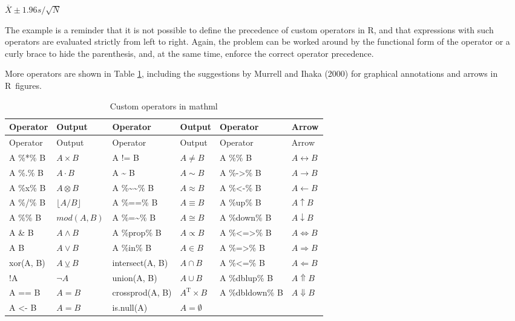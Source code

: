 \({\overline{X}}{\pm}{{{1.96}{{}}{s}}{/}{\sqrt{N}}}\)

The example is a reminder that it is not possible to define the
precedence of custom operators in R, and that expressions with such
operators are evaluated strictly from left to right. Again, the problem
can be worked around by the functional form of the operator or a curly
brace to hide the parenthesis, and, at the same time, enforce the
correct operator precedence.

More operators are shown in Table
\protect\hyperlink{tab:custom-operators}{1}, including the suggestions by Murrell
and Ihaka (2000) for graphical annotations and arrows in R~figures.

\hypertarget{tab:custom-operators}{}
\begin{longtable}[]{@{}llllll@{}}
\caption{Custom operators in mathml}\tabularnewline
\toprule\noalign{}
Operator & Output & Operator & Output & Operator & Arrow \\
\midrule\noalign{}
\endfirsthead
\toprule\noalign{}
Operator & Output & Operator & Output & Operator & Arrow \\
\midrule\noalign{}
\endhead
\bottomrule\noalign{}
\endlastfoot
A \%*\% B & \({A}{\times}{B}\) & A != B & \({A}{\ne}{B}\) & A \%\% B & \({A}{\leftrightarrow}{B}\) \\
A \%.\% B & \({A}{\cdot}{B}\) & A \textasciitilde{} B & \({A}{\sim}{B}\) & A \%-\textgreater\% B & \({A}{\rightarrow}{B}\) \\
A \%x\% B & \({A}{\otimes}{B}\) & A \%\textasciitilde\textasciitilde\% B & \({A}{\approx}{B}\) & A \%\textless-\% B & \({A}{\leftarrow}{B}\) \\
A \%/\% B & \(\lfloor{{A}{/}{B}}\rfloor\) & A \%==\% B & \({A}{\equiv}{B}\) & A \%up\% B & \({A}{\uparrow}{B}\) \\
A \%\% B & \(mod{\left({A}{{,}{B}}\right)}\) & A \%=\textasciitilde\% B & \({A}{\cong}{B}\) & A \%down\% B & \({A}{\downarrow}{B}\) \\
A \& B & \({A}{\land}{B}\) & A \%prop\% B & \({A}{\propto}{B}\) & A \%\textless=\textgreater\% B & \({A}{\iff}{B}\) \\
A \textbar{} B & \({A}{\lor}{B}\) & A \%in\% B & \({A}{\in}{B}\) & A \%=\textgreater\% B & \({A}{\Rightarrow}{B}\) \\
xor(A, B) & \({A}{\veebar}{B}\) & intersect(A, B) & \({A}{\cap}{B}\) & A \%\textless=\% B & \({A}{\Leftarrow}{B}\) \\
!A & \({\lnot}{A}\) & union(A, B) & \({A}{\cup}{B}\) & A \%dblup\% B & \({A}{\Uparrow}{B}\) \\
A == B & \({A}{=}{B}\) & crossprod(A, B) & \({{A}^{\mathrm{T}}}{\times}{B}\) & A \%dbldown\% B & \({A}{\Downarrow}{B}\) \\
A \textless- B & \({A}{=}{B}\) & is.null(A) & \({A}{=}{\emptyset}\) & & \(\mathrm{}\) \\
\end{longtable}

